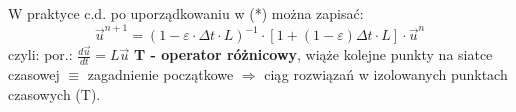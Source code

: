 \begin{frame}{W praktyce c.d.}
  po uporządkowaniu w (*) można zapisać:
  $$\vec{u}^{n+1} = (1-\varepsilon\cdot\Delta t\cdot L)^{-1}\cdot[1+(1-\varepsilon)\Delta t\cdot L]\cdot \vec{u}^n $$
  czyli:  \qquad por.: $\frac{d\vec{u}}{dt} = L\vec{u}$\newline\newline\newline
  \textbf{T - operator różnicowy}, wiąże kolejne punkty na siatce czasowej $\equiv$ zagadnienie początkowe $\Rightarrow$ ciąg rozwiązań w izolowanych punktach czasowych (T).
\end{frame}
